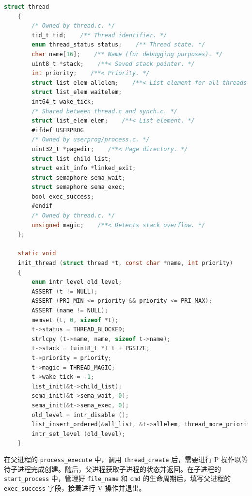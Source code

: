 \documentclass{article}
\begin{document}
\begin{lstlisting}[language=C]
	struct thread
	{
		/* Owned by thread.c. */
		tid_t tid;    /** Thread identifier. */
		enum thread_status status;    /** Thread state. */
		char name[16];    /** Name (for debugging purposes). */
		uint8_t *stack;    /**< Saved stack pointer. */ 
		int priority;    /**< Priority. */ 
		struct list_elem allelem;    /**< List element for all threads list. */ 
		struct list_elem waitelem; 
		int64_t wake_tick; 
		/* Shared between thread.c and synch.c. */ 
		struct list_elem elem;    /**< List element. */ 
		#ifdef USERPROG 
		/* Owned by userprog/process.c. */ 
		uint32_t *pagedir;    /**< Page directory. */ 
		struct list child_list; 
		struct exit_info *linked_exit; 
		struct semaphore sema_wait; 
		struct semaphore sema_exec; 
		bool exec_success; 
		#endif 
		/* Owned by thread.c. */ 
		unsigned magic;    /**< Detects stack overflow. */ 
	};
	
	static void 
	init_thread (struct thread *t, const char *name, int priority) 
	{ 
		enum intr_level old_level; 
		ASSERT (t != NULL); 
		ASSERT (PRI_MIN <= priority && priority <= PRI_MAX); 
		ASSERT (name != NULL); 
		memset (t, 0, sizeof *t); 
		t->status = THREAD_BLOCKED; 
		strlcpy (t->name, name, sizeof t->name); 
		t->stack = (uint8_t *) t + PGSIZE; 
		t->priority = priority; 
		t->magic = THREAD_MAGIC; 
		t->wake_tick = -1; 
		list_init(&t->child_list); 
		sema_init(&t->sema_wait, 0); 
		sema_init(&t->sema_exec, 0); 
		old_level = intr_disable (); 
		list_insert_ordered(&all_list, &t->allelem, thread_more_priority, NULL); 
		intr_set_level (old_level); 
	}
\end{lstlisting}

在父进程的 \texttt{process\_execute} 中，调用 \texttt{thread\_create} 后，需要进行 P 操作以等待子进程完成创建。随后，父进程获取子进程的状态并返回。在子进程的 \texttt{start\_process} 中，管理好 \texttt{file\_name} 和 \texttt{cmd} 的生命周期后，填写父进程的 \texttt{exec\_success} 字段，接着进行 V 操作并退出。
\end{document}
